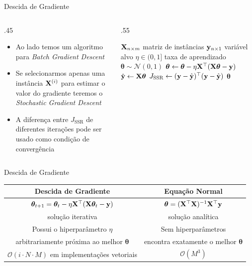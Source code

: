 \documentclass[aspectratio=169,xcolor=dvipsnames]{beamer}
\begin{document}
\begin{frame}{Descida de Gradiente}
\begin{columns}
    \begin{column}{.45\linewidth}
    \begin{itemize}
        \item Ao lado temos um algoritmo para \textit{Batch Gradient Descent} 
        \item Se selecionarmos apenas uma instância $\mathbf{X}^{(i)}$ para estimar o valor do gradiente teremos o \textit{Stochastic Gradient Descent}
        \item A diferença entre $J_{\text{SSR}}$ de diferentes iterações pode ser usado como condição de convergência
    \end{itemize}

    \end{column}
    \begin{column}{.55\linewidth}
        \begin{algorithmic}[1]
        \Require $\mathbf{X}_{n\times m}$ matriz de instâncias
        \Require $\mathbf{y}_{n\times 1}$ variável alvo
        \Require $\eta\in(0,1]$ taxa de aprendizado
        \State $\bm{\theta} \sim \mathcal{N}(0,1)$ 
        \Repeat 
            \State $\bm{\theta} \gets \bm{\theta}-\eta\mathbf{X}^\top(\mathbf{X}\bm{\theta}-\mathbf{y})$
            \State $\hat{\mathbf{y}}\gets\mathbf{X}\bm{\theta}$
            \State $J_{\text{SSR}} \gets (\mathbf{y}-\hat{\mathbf{y}})^\top(\mathbf{y}-\hat{\mathbf{y}})$ 
        \State \Return $\bm{\theta}$
        \EndProcedure
        \end{algorithmic}        
    \end{column}
\end{columns}
    
\end{frame}


\begin{frame}{Descida de Gradiente}
\begin{table}[]
    \centering
    \begin{tabular}{cc}
        \toprule
       Descida de Gradiente  & Equação Normal \\
       \hline
       $\bm{\theta}_{t+1}=\bm{\theta}_{t}-\eta\mathbf{X}^\top(\mathbf{X}\bm{\theta}_{t}-\mathbf{y})$&$\bm{\theta} = (\mathbf{X}^\top\mathbf{X})^{-1}\mathbf{X}^\top\mathbf{y}$\\
        solução iterativa & solução analítica \\
          Possui o hiperparâmetro $\eta$ & Sem hiperparâmetros \\
     arbitrariamente próxima ao melhor $\bm{\theta}$  & encontra exatamente o melhor $\bm{\theta}$ \\
          $\mathcal{O}(i\cdot N\cdot M)$ em implementações vetoriais& $\mathcal{O}(M^3)$ \\
        \bottomrule
    \end{tabular}
\end{table}
\end{frame}
\end{document}
